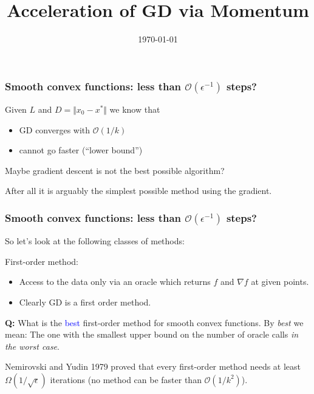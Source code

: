 \documentclass{beamer}
\title{Acceleration of GD via Momentum}
\date{\today}
\begin{document}
\maketitle
\frame{\tableofcontents}

\section{}

\begin{frame}
  \frametitle{Smooth convex functions: less than $\mathcal{O}(\epsilon^{-1})$ steps?}
  Given $L$ and $D=\Vert x_0 - x^* \Vert$ we know that
  \begin{itemize}
    \item GD converges with $\mathcal{O}(1/k)$
    \item cannot go faster (``lower bound'')
  \end{itemize}

  Maybe gradient descent is not the best possible algorithm? \medskip

  After all it is arguably the simplest possible method using the gradient.
\end{frame}


\begin{frame}
  \frametitle{Smooth convex functions: less than $\mathcal{O}(\epsilon^{-1})$ steps?}

  So let's look at the following classes of methods:

  First-order method:
  \begin{itemize}
    \item Access to the data only via an oracle which returns $f$ and $\nabla f$ at given points.
    \item Clearly GD is a first order method.
  \end{itemize}

  \textbf{Q:} What is the \textcolor{blue}{best} first-order method for smooth convex functions.
  By \textit{best} we mean: The one with the smallest upper bound on the number of oracle calls \textit{in the worst case}.

  Nemirovski and Yudin 1979 proved that every first-order method needs at least $\Omega(1/\sqrt{\epsilon})$ iterations (no method can be faster than $\mathcal{O}(1/k^2)$).
\end{frame}
\end{document}

